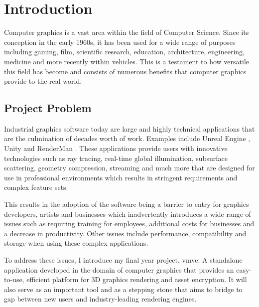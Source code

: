 \documentclass[11pt]{article}
\begin{document}
\pagebreak
{
  \hypersetup{linkcolor=black}
  \tableofcontents
}
\pagebreak

\clearpage
\printnoidxglossary[nonumberlist]

\clearpage
\printnoidxglossary[type=\acronymtype, nonumberlist]

\pagebreak
\pagestyle{fancy}

\section{Introduction}
Computer graphics is a vast area within the field of Computer Science. Since its
conception in the early 1960s, it has been used for a wide range of purposes
including gaming, film, scientific research, education, architecture,
engineering, medicine and more recently within vehicles. This is a testament to
how versatile this field has become and consists of numerous benefits that
computer graphics provide to the real world.

\subsection{Project Problem}
Industrial graphics software today are large and highly technical applications
that are the culmination of decades worth of work. Examples include Unreal
Engine \cite{unreal_engine}, Unity \cite{unity} and RenderMan \cite{render_man}.
These applications provide users with innovative technologies such as ray tracing,
real-time global illumination, subsurface scattering, geometry compression,
streaming and much more that are designed for use in professional environments
which results in stringent requirements and complex feature sets.

This results in the adoption of the software being a barrier to entry for
graphics developers, artists and businesses which inadvertently introduces a
wide range of issues such as requiring training for employees, additional costs
for businesses and a decrease in productivity. Other issues include performance,
compatibility and storage when using these complex applications.


To address these issues, I introduce my final year project, \gls*{vmve}. A
standalone application developed in the domain of computer graphics that
provides an easy-to-use, efficient platform for 3D graphics rendering and asset
encryption. It will also serve as an important tool and as a stepping stone that
aims to bridge to gap between new users and industry-leading rendering engines.
\end{document}
